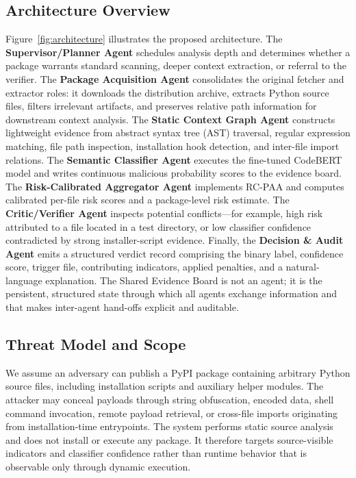 \documentclass[conference,a4paper]{IEEEtran}
\newcommand{\rcpaa}{RC-PAA}
\newcommand{\codebert}{CodeBERT}
\begin{document}
\subsection{Architecture Overview}
Figure~\ref{fig:architecture} illustrates the proposed architecture. The
\textbf{Supervisor/Planner Agent} schedules analysis depth and determines whether a
package warrants standard scanning, deeper context extraction, or referral to the
verifier. The \textbf{Package Acquisition Agent} consolidates the original fetcher and
extractor roles: it downloads the distribution archive, extracts Python source files,
filters irrelevant artifacts, and preserves relative path information for downstream
context analysis. The \textbf{Static Context Graph Agent} constructs lightweight
evidence from abstract syntax tree (AST) traversal, regular expression matching, file
path inspection, installation hook detection, and inter-file import relations. The
\textbf{Semantic Classifier Agent} executes the fine-tuned \codebert{} model and writes
continuous malicious probability scores to the evidence board. The \textbf{Risk-Calibrated
Aggregator Agent} implements \rcpaa{} and computes calibrated per-file risk scores and
a package-level risk estimate. The \textbf{Critic/Verifier Agent} inspects potential
conflicts---for example, high risk attributed to a file located in a test directory, or
low classifier confidence contradicted by strong installer-script evidence. Finally, the
\textbf{Decision \& Audit Agent} emits a structured verdict record comprising the
binary label, confidence score, trigger file, contributing indicators, applied penalties,
and a natural-language explanation. The Shared Evidence Board is not an agent; it is
the persistent, structured state through which all agents exchange information and that
makes inter-agent hand-offs explicit and auditable.

\subsection{Threat Model and Scope}
We assume an adversary can publish a PyPI package containing arbitrary Python source
files, including installation scripts and auxiliary helper modules. The attacker may
conceal payloads through string obfuscation, encoded data, shell command invocation,
remote payload retrieval, or cross-file imports originating from installation-time
entrypoints. The system performs static source analysis and does not install or execute
any package. It therefore targets source-visible indicators and classifier confidence
rather than runtime behavior that is observable only through dynamic execution.
\end{document}
